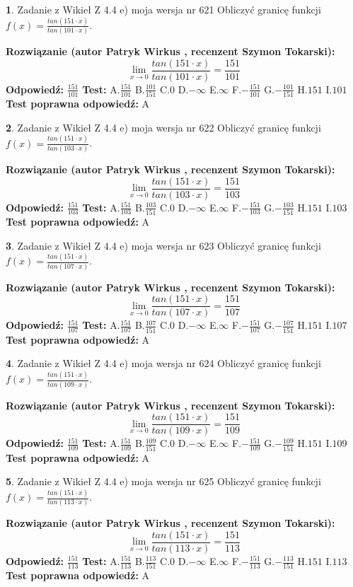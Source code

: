 \documentclass[12pt, a4paper]{article}
\theoremstyle{definition} %
\newtheorem{zad}{}
\newcommand{\zadStart}[1]{\begin{zad}#1\newline}
\newcommand{\zadStop}{\end{zad}}
\newcommand{\rozwStart}[2]{\noindent \textbf{Rozwiązanie (autor #1 , recenzent #2): }\newline}
\newcommand{\rozwStop}{\newline}
\newcommand{\odpStart}{\noindent \textbf{Odpowiedź:}\newline}
\newcommand{\odpStop}{\newline}
\newcommand{\testStart}{\noindent \textbf{Test:}\newline}
\newcommand{\testStop}{\newline}
\newcommand{\kluczStart}{\noindent \textbf{Test poprawna odpowiedź:}\newline}
\newcommand{\kluczStop}{\newline}
\begin{document}
\zadStart{Zadanie z Wikieł Z 4.4 e) moja wersja nr 621}
Obliczyć granicę funkcji $f(x)=\frac{tan(151\cdot x)}{tan(101\cdot x)}$.
\zadStop
\rozwStart{Patryk Wirkus}{Szymon Tokarski}
$$\lim\limits_{x\to 0}\frac{tan(151\cdot x)}{tan(101\cdot x)}=
\frac{151}{101}$$
\rozwStop
\odpStart
$\frac{151}{101}$
\odpStop
\testStart
A.$\frac{151}{101}$
B.$\frac{101}{151}$
C.$0$
D.$-\infty$
E.$\infty$
F.$-\frac{151}{101}$
G.$-\frac{101}{151}$
H.$151$
I.$101$
\testStop
\kluczStart
A
\kluczStop



\zadStart{Zadanie z Wikieł Z 4.4 e) moja wersja nr 622}
Obliczyć granicę funkcji $f(x)=\frac{tan(151\cdot x)}{tan(103\cdot x)}$.
\zadStop
\rozwStart{Patryk Wirkus}{Szymon Tokarski}
$$\lim\limits_{x\to 0}\frac{tan(151\cdot x)}{tan(103\cdot x)}=
\frac{151}{103}$$
\rozwStop
\odpStart
$\frac{151}{103}$
\odpStop
\testStart
A.$\frac{151}{103}$
B.$\frac{103}{151}$
C.$0$
D.$-\infty$
E.$\infty$
F.$-\frac{151}{103}$
G.$-\frac{103}{151}$
H.$151$
I.$103$
\testStop
\kluczStart
A
\kluczStop



\zadStart{Zadanie z Wikieł Z 4.4 e) moja wersja nr 623}
Obliczyć granicę funkcji $f(x)=\frac{tan(151\cdot x)}{tan(107\cdot x)}$.
\zadStop
\rozwStart{Patryk Wirkus}{Szymon Tokarski}
$$\lim\limits_{x\to 0}\frac{tan(151\cdot x)}{tan(107\cdot x)}=
\frac{151}{107}$$
\rozwStop
\odpStart
$\frac{151}{107}$
\odpStop
\testStart
A.$\frac{151}{107}$
B.$\frac{107}{151}$
C.$0$
D.$-\infty$
E.$\infty$
F.$-\frac{151}{107}$
G.$-\frac{107}{151}$
H.$151$
I.$107$
\testStop
\kluczStart
A
\kluczStop



\zadStart{Zadanie z Wikieł Z 4.4 e) moja wersja nr 624}
Obliczyć granicę funkcji $f(x)=\frac{tan(151\cdot x)}{tan(109\cdot x)}$.
\zadStop
\rozwStart{Patryk Wirkus}{Szymon Tokarski}
$$\lim\limits_{x\to 0}\frac{tan(151\cdot x)}{tan(109\cdot x)}=
\frac{151}{109}$$
\rozwStop
\odpStart
$\frac{151}{109}$
\odpStop
\testStart
A.$\frac{151}{109}$
B.$\frac{109}{151}$
C.$0$
D.$-\infty$
E.$\infty$
F.$-\frac{151}{109}$
G.$-\frac{109}{151}$
H.$151$
I.$109$
\testStop
\kluczStart
A
\kluczStop



\zadStart{Zadanie z Wikieł Z 4.4 e) moja wersja nr 625}
Obliczyć granicę funkcji $f(x)=\frac{tan(151\cdot x)}{tan(113\cdot x)}$.
\zadStop
\rozwStart{Patryk Wirkus}{Szymon Tokarski}
$$\lim\limits_{x\to 0}\frac{tan(151\cdot x)}{tan(113\cdot x)}=
\frac{151}{113}$$
\rozwStop
\odpStart
$\frac{151}{113}$
\odpStop
\testStart
A.$\frac{151}{113}$
B.$\frac{113}{151}$
C.$0$
D.$-\infty$
E.$\infty$
F.$-\frac{151}{113}$
G.$-\frac{113}{151}$
H.$151$
I.$113$
\testStop
\kluczStart
A
\kluczStop
\end{document}
